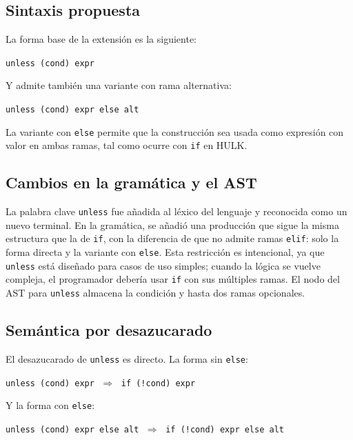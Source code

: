 \documentclass[12pt, a4paper]{article}
\begin{document}
\subsection{Sintaxis propuesta}

La forma base de la extensión es la siguiente:

\begin{center}
\texttt{unless (cond) expr}
\end{center}

Y admite también una variante con rama alternativa:

\begin{center}
\texttt{unless (cond) expr else alt}
\end{center}

La variante con \texttt{else} permite que la construcción sea usada como expresión con valor en ambas ramas, tal como ocurre con \texttt{if} en HULK.

\subsection{Cambios en la gramática y el AST}

La palabra clave \texttt{unless} fue añadida al léxico del lenguaje y reconocida como un nuevo terminal. En la gramática, se añadió una producción que sigue la misma estructura que la de \texttt{if}, con la diferencia de que no admite ramas \texttt{elif}: solo la forma directa y la variante con \texttt{else}. Esta restricción es intencional, ya que \texttt{unless} está diseñado para casos de uso simples; cuando la lógica se vuelve compleja, el programador debería usar \texttt{if} con sus múltiples ramas. El nodo del AST para \texttt{unless} almacena la condición y hasta dos ramas opcionales.

\subsection{Semántica por desazucarado}

El desazucarado de \texttt{unless} es directo. La forma sin \texttt{else}:

\begin{center}
\texttt{unless (cond) expr}  $\;\Rightarrow\;$  \texttt{if (!cond) expr}
\end{center}

Y la forma con \texttt{else}:

\begin{center}
\texttt{unless (cond) expr else alt}  $\;\Rightarrow\;$  \texttt{if (!cond) expr else alt}
\end{center}
\end{document}

